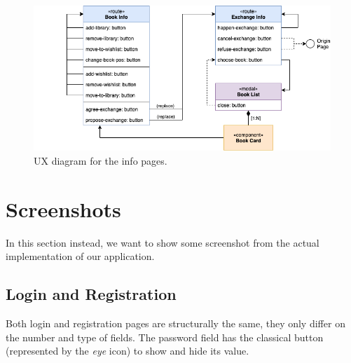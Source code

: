 \begin{figure}[H]
      \includegraphics{ux-diagram/ux-info.png}
      \caption{UX diagram for the info pages.}
      \label{fig:ux-info}
\end{figure}

\clearpage
\section{Screenshots}
In this section instead, we want to show some screenshot from the actual implementation of our application.

\subsection{Login and Registration}
Both login and registration pages are structurally the same, they only differ on the number and type of fields.
The password field has the classical button (represented by the \emph{eye} icon) to show and hide its value.

